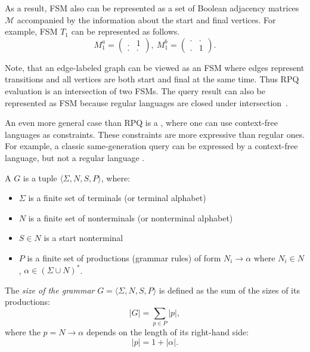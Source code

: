 As a result, FSM also can be represented as a set of Boolean adjacency matrices $\mathcal{M}$ accompanied by the information about the start and final vertices.
For example, FSM $T_1$ can be represented as follows.
$$
M_1^a =
\begin{pmatrix}
.&1 \\
.&.
\end{pmatrix},~
M_1^b =
\begin{pmatrix}
.&. \\
.&1
\end{pmatrix}.
$$

Note, that an edge-labeled graph can be viewed as an FSM where edges represent transitions and all vertices are both start and final at the same time.
Thus RPQ evaluation is an intersection of two FSMs.
The query result can also be represented as FSM because regular languages are closed under intersection~\cite{automata:theory:10.5555/1177300}.


An even more general case than RPQ is a , where one can use context-free languages as constraints.
These constraints are more expressive than regular ones.
For example, a classic same-generation query can be expressed by a context-free language, but not a regular language \cite{databasebook}.

\begin{definition}
A  $G$ is a tuple $\langle\Sigma, N, S, P\rangle$, where:
\begin{itemize}
    \item $\Sigma$ is a finite set of terminals (or terminal alphabet)
    \item $N$ is a finite set of nonterminals (or nonterminal alphabet)
    \item $S \in N$ is a start nonterminal
    \item $P$ is a finite set of productions (grammar rules) of form $N_i \to \alpha$ where  $N_i \in N$, $\alpha \in (\Sigma \cup N)^*$.
\end{itemize}
\end{definition}

\begin{definition}

    The \emph{size of the grammar} $G = \langle \Sigma, N, S, P \rangle$ is defined as the sum of the sizes of its productions:
    \[|G| = \sum_{p \in P} |p|,\]
    where the  $p = N \to \alpha$ depends on the length of its right-hand side:
    \[|p| = 1 + |\alpha|.\]

\end{definition}

